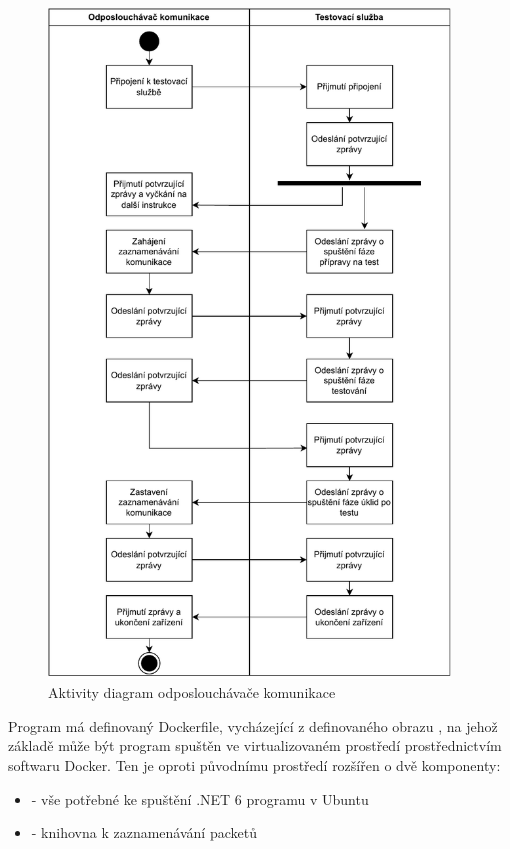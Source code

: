 \begin{figure}[htbp]
    \centering 
    \includegraphics[width=0.95\textwidth]{assets/img/activity_networklogger.pdf}
    \caption{Aktivity diagram odposlouchávače komunikace}
    \label{fig:logger_activity}
\end{figure}

Program má definovaný Dockerfile, vycházející z definovaného obrazu , na jehož základě může být program spuštěn ve virtualizovaném prostředí prostřednictvím softwaru Docker. Ten je oproti původnímu prostředí rozšířen o dvě komponenty:

\begin{itemize}
    \item {} - vše potřebné ke spuštění .NET 6 programu v Ubuntu
    \item {} - knihovna k zaznamenávání packetů 
\end{itemize}

